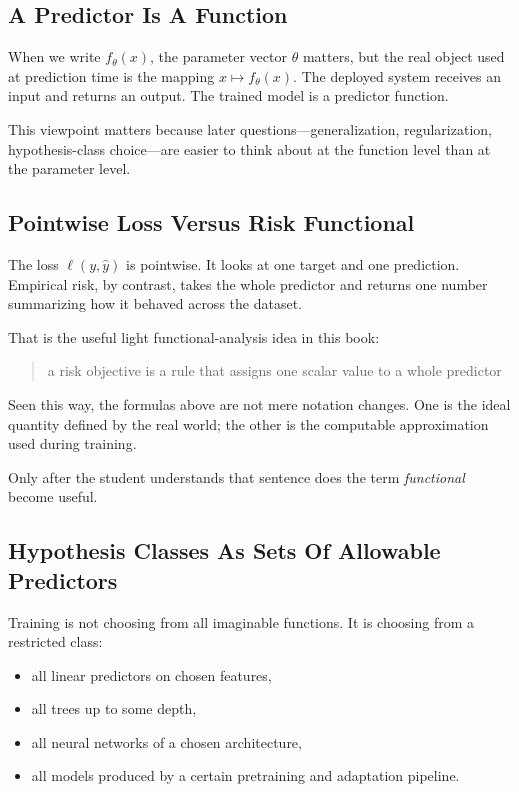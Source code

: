 \subsection*{A Predictor Is A Function}

When we write \(f_\theta(x)\), the parameter vector \(\theta\) matters, but the real object used at prediction time is the mapping \(x \mapsto f_\theta(x)\). The deployed system receives an input and returns an output. The trained model is a predictor function.

This viewpoint matters because later questions---generalization, regularization, hypothesis-class choice---are easier to think about at the function level than at the parameter level.

\subsection*{Pointwise Loss Versus Risk Functional}

The loss \(\ell(y, \hat{y})\) is pointwise. It looks at one target and one prediction. Empirical risk, by contrast, takes the whole predictor and returns one number summarizing how it behaved across the dataset.

That is the useful light functional-analysis idea in this book:

\begin{quote}
a risk objective is a rule that assigns one scalar value to a whole predictor
\end{quote}

Seen this way, the formulas above are not mere notation changes. One is the ideal quantity defined by the real world; the other is the computable approximation used during training.

Only after the student understands that sentence does the term \emph{functional} become useful.

\subsection*{Hypothesis Classes As Sets Of Allowable Predictors}

Training is not choosing from all imaginable functions. It is choosing from a restricted class:

\begin{itemize}[leftmargin=*]
\item all linear predictors on chosen features,
\item all trees up to some depth,
\item all neural networks of a chosen architecture,
\item all models produced by a certain pretraining and adaptation pipeline.
\end{itemize}

